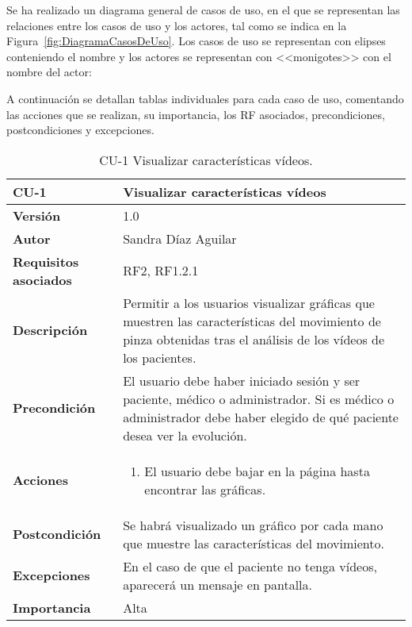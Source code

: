 Se ha realizado un diagrama general de casos de uso, en el que se representan las relaciones entre los casos de uso y los actores, tal como se indica en la Figura~\ref{fig:DiagramaCasosDeUso}. Los casos de uso se representan con elipses conteniendo el nombre y los actores se representan con <<monigotes>> con el nombre del actor:

A continuación se detallan tablas individuales para cada caso de uso, comentando las acciones que se realizan, su importancia, los RF asociados, precondiciones, postcondiciones y excepciones.

\begin{table}[p]
	\centering
	\begin{tabularx}{\linewidth}{ p{} p{} }
		\toprule
		\textbf{CU-1}    & \textbf{Visualizar características vídeos}\\
		\toprule
		\textbf{Versión}              & 1.0    \\
		\textbf{Autor}                & Sandra Díaz Aguilar \\
		\textbf{Requisitos asociados} & RF2, RF1.2.1 \\
		\textbf{Descripción}          & Permitir a los usuarios visualizar gráficas que muestren las características del movimiento de pinza obtenidas tras el análisis de los vídeos de los pacientes. \\
		\textbf{Precondición}         & El usuario debe haber iniciado sesión y ser paciente, médico o administrador. Si es médico o administrador debe haber elegido de qué paciente desea ver la evolución. \\
		\textbf{Acciones}             &
		\begin{enumerate}
			\def\labelenumi{\arabic{enumi}.}
			\tightlist
			\item El usuario debe bajar en la página hasta encontrar las gráficas. 
		\end{enumerate}\\
		\textbf{Postcondición}        & Se habrá visualizado un gráfico por cada mano que muestre las características del movimiento. \\
		\textbf{Excepciones}          & En el caso de que el paciente no tenga vídeos, aparecerá un mensaje en pantalla.  \\
		\textbf{Importancia}          & Alta \\
		\bottomrule
	\end{tabularx}
	\caption{CU-1 Visualizar características vídeos.}
\end{table}


